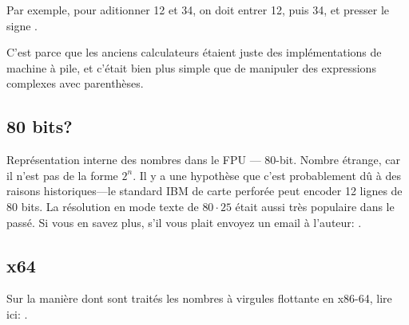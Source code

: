 Par exemple, pour aditionner 12 et 34, on doit entrer 12, puis 34, et presser le signe
.

C'est parce que les anciens calculateurs étaient juste des implémentations de machine
à pile, et c'était bien plus simple que de manipuler des expressions complexes avec
parenthèses.

\subsection{80 bits?}


Représentation interne des nombres dans le FPU --- 80-bit.
Nombre étrange, car il n'est pas de la forme $2^n$.
Il y a une hypothèse que c'est probablement dû à des raisons historiques---le standard
IBM de carte perforée peut encoder 12 lignes de 80 bits.
La résolution en mode texte de $80\cdot 25$ était aussi très populaire dans le passé.
Si vous en savez plus, s'il vous plait envoyez un email à l'auteur: \EMAIL{}.

\subsection{x64}

Sur la manière dont sont traités les nombres à virgules flottante en x86-64, lire
ici: .


